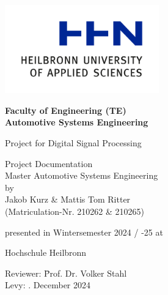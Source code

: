 \begin{titlepage}
	\centering
	\includegraphics[width=0.5\textwidth]{2023_11_29_Bilder_Dokumentation/hhn-logo.png}

	\vspace*{15mm}

	{\LARGE \textbf{Faculty of Engineering (TE)\\Automotive Systems Engineering}}

	\vspace*{15mm}

	{\Huge Project for Digital Signal Processing}

	\vspace*{15mm}

	{\Large Project Documentation}\\
	Master Automotive Systems Engineering\\

	by\\

	{\Large Jakob Kurz \& Mattis Tom Ritter}\\
	(Matriculation-Nr. 210262 \& 210265)\\

	\vspace{5mm}

	presented in Wintersemester 2024 / -25 at\\

	\vspace{5mm}

	{\Large Hochschule Heilbronn}

	\vspace*{10mm}

	\begin{tabbing}
		\hspace*{4cm}Reviewer: \hspace*{1cm}\=Prof. Dr. Volker Stahl\\
		\hspace*{4cm}Levy: . December 2024
	\end{tabbing}
\end{titlepage}
